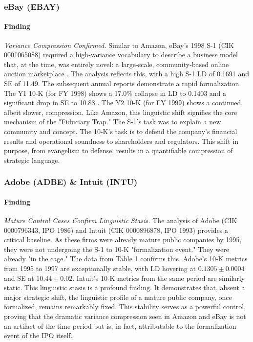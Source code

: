 \documentclass[12pt, letterpaper]{article}
\begin{document}
\subsubsection{eBay (EBAY)}
\paragraph{Finding} \textit{Variance Compression Confirmed.}
Similar to Amazon, eBay's 1998 S-1 (CIK 0001065088) required a high-variance vocabulary to describe a business model that, at the time, was entirely novel: a large-scale, community-based online auction marketplace \cite{key7}. The analysis reflects this, with a high S-1 LD of 0.1691 and SE of 11.49. The subsequent annual reports demonstrate a rapid formalization. The Y1 10-K (for FY 1998) shows a 17.0\% collapse in LD to 0.1403 and a significant drop in SE to 10.88 \cite{key26, key27}. The Y2 10-K (for FY 1999) shows a continued, albeit slower, compression. Like Amazon, this linguistic shift signifies the core mechanism of the "Fiduciary Trap." The S-1's task was to explain a new community and concept. The 10-K's task is to defend the company's financial results and operational soundness to shareholders and regulators. This shift in purpose, from evangelism to defense, results in a quantifiable compression of strategic language.

\subsubsection{Adobe (ADBE) \& Intuit (INTU)}
\paragraph{Finding} \textit{Mature Control Cases Confirm Linguistic Stasis.}
The analysis of Adobe (CIK 0000796343, IPO 1986) \cite{key21} and Intuit (CIK 0000896878, IPO 1993) \cite{key22} provides a critical baseline. As these firms were already mature public companies by 1995, they were not undergoing the S-1 to 10-K "formalization event." They were already "in the cage." The data from Table 1 confirms this. Adobe's 10-K metrics from 1995 to 1997 are exceptionally stable, with LD hovering at $0.1305 \pm 0.0004$ and SE at $10.44 \pm 0.02$. Intuit's 10-K metrics from the same period are similarly static. This linguistic stasis is a profound finding. It demonstrates that, absent a major strategic shift, the linguistic profile of a mature public company, once formalized, remains remarkably fixed. This stability serves as a powerful control, proving that the dramatic variance compression seen in Amazon and eBay is not an artifact of the time period but is, in fact, attributable to the formalization event of the IPO itself.
\end{document}
